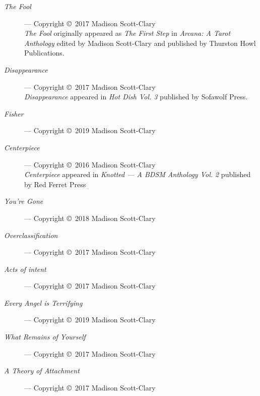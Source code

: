 \begin{description}
    \item[\emph{The Fool}]
    --- Copyright \copyright\ 2017 Madison Scott-Clary\\
    \emph{The Fool} originally appeared as \emph{The First Step} in \emph{Arcana: A Tarot Anthology} edited by Madison Scott-Clary and published by Thurston Howl Publications.
    \item[\emph{Disappearance}]
    --- Copyright \copyright\ 2017 Madison Scott-Clary\\
    \emph{Disappearance} appeared in \emph{Hot Dish Vol. 3} published by Sofawolf Press.
    \item[\emph{Fisher}]
    --- Copyright \copyright\ 2019 Madison Scott-Clary
    \item[\emph{Centerpiece}]
    --- Copyright \copyright\ 2016 Madison Scott-Clary\\
    \emph{Centerpiece} appeared in \emph{Knotted --- A BDSM Anthology Vol. 2} published by Red Ferret Press
    \item[\emph{You're Gone}]
    --- Copyright \copyright\ 2018 Madison Scott-Clary
    \item[\emph{Overclassification}]
    --- Copyright \copyright\ 2017 Madison Scott-Clary
    \item[\emph{Acts of intent}]
    --- Copyright \copyright\ 2017 Madison Scott-Clary
    \item[\emph{Every Angel is Terrifying}]
    --- Copyright \copyright\ 2019 Madison Scott-Clary
    \item[\emph{What Remains of Yourself}]
    --- Copyright \copyright\ 2017 Madison Scott-Clary
    \item[\emph{A Theory of Attachment}]
    --- Copyright \copyright\ 2017 Madison Scott-Clary
\end{description}
